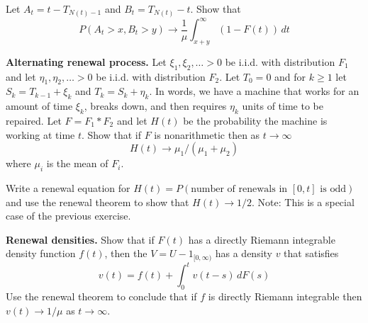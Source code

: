   \begin{exercise}[Durrett 2.6.6]
    Let $A_t = t - T_{N(t)-1}$ and $B_t = T_{N(t)} - t$. Show that
    \begin{equation*}
      P(A_t > x, B_t > y) \to \frac{1}{\mu} \int_{x+y}^{\infty} (1 - F(t)) \, dt
    \end{equation*}
  \end{exercise}
  \begin{solution}

  \end{solution}

  \begin{exercise}[Durrett 2.6.7]
    \textbf{Alternating renewal process.} Let $\xi_1, \xi_2, \dots > 0$ be i.i.d. with distribution $F_1$ and let $\eta_1, \eta_2, \dots > 0$ be i.i.d. with distribution $F_2$. Let $T_0 = 0$ and for $k \geq 1$ let $S_k = T_{k-1} + \xi_k$ and $T_k = S_k + \eta_k$. In words, we have a machine that works for an amount of time $\xi_k$, breaks down, and then requires $\eta_k$ units of time to be repaired. Let $F = F_1 * F_2$ and let $H(t)$ be the probability the machine is working at time $t$. Show that if $F$ is nonarithmetic then as $t \to \infty$
    \begin{equation*}
      H(t) \to \mu_1/(\mu_1 + \mu_2)
    \end{equation*}
    where $\mu_i$ is the mean of $F_i$.
  \end{exercise}
  \begin{solution}

  \end{solution}

  \begin{exercise}[Durrett 2.6.8]
    Write a renewal equation for $H(t) = P(\text{number of renewals in } [0, t] \text{ is odd})$ and use the renewal theorem to show that $H(t) \to 1/2$. Note: This is a special case of the previous exercise.
  \end{exercise}
  \begin{solution}

  \end{solution}

  \begin{exercise}[Durrett 2.6.9]
    \textbf{Renewal densities.} Show that if $F(t)$ has a directly Riemann integrable density function $f(t)$, then the $V = U - 1_{[0, \infty)}$ has a density $v$ that satisfies
    \begin{equation*}
      v(t) = f(t) + \int_0^t v(t - s) \, dF(s)
    \end{equation*}
    Use the renewal theorem to conclude that if $f$ is directly Riemann integrable then $v(t) \to 1/\mu$ as $t \to \infty$.
  \end{exercise}
  \begin{solution}

  \end{solution}

